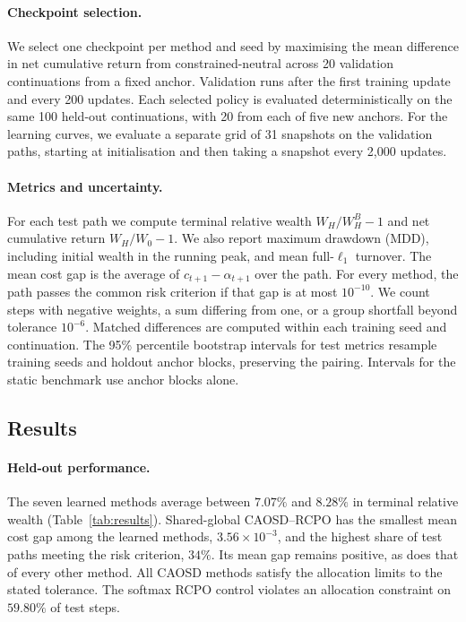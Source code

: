 \documentclass[10pt]{article}
\begin{document}
\paragraph{Checkpoint selection.}
We select one checkpoint per method and seed by maximising the mean difference in net cumulative return from constrained-neutral across 20 validation continuations from a fixed anchor. Validation runs after the first training update and every 200 updates. Each selected policy is evaluated deterministically on the same 100 held-out continuations, with 20 from each of five new anchors. For the learning curves, we evaluate a separate grid of 31 snapshots on the validation paths, starting at initialisation and then taking a snapshot every 2,000 updates.

\paragraph{Metrics and uncertainty.}
For each test path we compute terminal relative wealth $W_H/W_H^B-1$ and net cumulative return $W_H/W_0-1$. We also report maximum drawdown (MDD), including initial wealth in the running peak, and mean full-$\ell_1$ turnover. The mean cost gap is the average of $c_{t+1}-\alpha_{t+1}$ over the path. For every method, the path passes the common risk criterion if that gap is at most $10^{-10}$. We count steps with negative weights, a sum differing from one, or a group shortfall beyond tolerance $10^{-6}$. Matched differences are computed within each training seed and continuation. The 95\% percentile bootstrap intervals for test metrics resample training seeds and holdout anchor blocks, preserving the pairing. Intervals for the static benchmark use anchor blocks alone.

\subsection{Results}

\paragraph{Held-out performance.}
The seven learned methods average between $7.07\%$ and $8.28\%$ in terminal relative wealth (Table~\ref{tab:results}). Shared-global CAOSD--RCPO has the smallest mean cost gap among the learned methods, $3.56\times10^{-3}$, and the highest share of test paths meeting the risk criterion, $34\%$. Its mean gap remains positive, as does that of every other method. All CAOSD methods satisfy the allocation limits to the stated tolerance. The softmax RCPO control violates an allocation constraint on $59.80\%$ of test steps.
\end{document}
